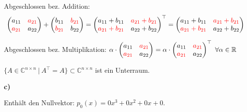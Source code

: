 \begin{solution}
    \vspace{0.5\baselineskip}

    Abgeschlossen bez. Addition: 
    \begin{equation*}
        \begin{pmatrix}
            a_{11} & \textcolor{red}{a_{21}} \\
            \textcolor{red}{a_{21}} & a_{22}
        \end{pmatrix} + \begin{pmatrix}
            b_{11} & \textcolor{red}{b_{21}} \\
            \textcolor{red}{b_{21}} & b_{22}
        \end{pmatrix} = \begin{pmatrix}
            a_{11} + b_{11} & \textcolor{red}{a_{21} + b_{21}} \\
            \textcolor{red}{a_{21} + b_{21}} & a_{22} + b_{22}
            \end{pmatrix}^\top = \begin{pmatrix}
            a_{11} + b_{11} & \textcolor{red}{a_{21} + b_{21}} \\
            \textcolor{red}{a_{21} + b_{21}} & a_{22} + b_{22}
        \end{pmatrix}
    \end{equation*}

    Abgeschlossen bez. Multiplikation: \( \alpha \cdot \begin{pmatrix}
        a_{11} & \textcolor{red}{a_{21}} \\
        \textcolor{red}{a_{21}} & a_{22}
    \end{pmatrix} = \alpha \cdot \begin{pmatrix}
        a_{11} & \textcolor{red}{a_{21}} \\
        \textcolor{red}{a_{21}} & a_{22}
    \end{pmatrix}^\top \ \forall \alpha \in \mathbb{R} \)

    \vspace{1\baselineskip}

    \( \{A\in \mathbb{C}^{n \times n}\: |\: A^\top = A \} \subset \mathbb{C}^{n \times n} \) ist ein Unterraum.

    \vspace{1\baselineskip}

    \textbf{c)}

    \vspace{0.5\baselineskip}

    Enthält den Nullvektor: \( p_0(x) = 0x^3 + 0x^2 + 0x + 0. \)


\end{solution}
